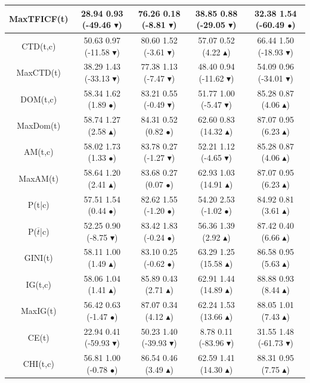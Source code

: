 \documentclass[10pt, red]{beamer}
\newcommand{\triangOK}{\textcolor[rgb]{00,0.45,0.10}{$\blacktriangle$}}
\newcommand{\triangBAD}{\textcolor[rgb]{0.7,00,00}{$\blacktriangledown$}}
\newcommand{\ball}{\textcolor[rgb]{0.7,0.70,0.0}{$\bullet$}}
\begin{document}
{\begin{table}[h]
\begin{adjustwidth}{-0.95cm}{-0.95cm}
\begin{tabular}{|c||c|c|c|c|}
\hline 
MaxTFICF(t)& 28.94 \textpm{} 0.93 (-49.46 \triangBAD)& 76.26 \textpm{} 0.18 (-8.81 \triangBAD)& 38.85 \textpm{} 0.88 (-29.05 \triangBAD)& 32.38 \textpm{} 1.54 (-60.49 \ball)\tabularnewline
\hline 
CTD(t,c)& 50.63 \textpm{} 0.97 (-11.58 \triangBAD)& 80.60 \textpm{} 1.52 (-3.61 \triangBAD)& 57.07 \textpm{} 0.52 (4.22 \triangOK)& 66.44 \textpm{} 1.50 (-18.93 \triangBAD)\tabularnewline
\hline 
MaxCTD(t)& 38.29 \textpm{} 1.43 (-33.13 \triangBAD)& 77.38 \textpm{} 1.13 (-7.47 \triangBAD)& 48.40 \textpm{} 0.94 (-11.62 \triangBAD)& 54.09 \textpm{} 0.96 (-34.01 \triangBAD)\tabularnewline
\hline 
DOM(t,c)& 58.34 \textpm{} 1.62 (1.89 \ball)&  83.21 \textpm{} 0.55 (-0.49 \triangBAD)& 51.77 \textpm{} 1.00 (-5.47 \triangBAD)& 85.28 \textpm{} 0.87 (4.06 \triangOK)\tabularnewline
\hline 
MaxDom(t)& 58.74 \textpm{} 1.27 (2.58 \triangOK)& 84.31 \textpm{} 0.52 (0.82 \ball)& 62.60 \textpm{} 0.83 (14.32 \triangOK)& 87.07 \textpm{} 0.95 (6.23 \triangOK)\tabularnewline
\hline 
\rowcolor{LightCyan2}
AM(t,c)& 58.02 \textpm{} 1.73 (1.33 \ball)& 83.78 \textpm{} 0.27 (-1.27 \triangBAD) & 52.21 \textpm{} 1.12 (-4.65 \triangBAD)& 85.28 \textpm{} 0.87 (4.06 \triangOK)\tabularnewline
\hline 
MaxAM(t)& 58.64 \textpm{} 1.20 (2.41 \triangOK)& 83.68 \textpm{} 0.27 (0.07 \ball)& 62.93 \textpm{} 1.03 (14.91 \triangOK)& 87.07 \textpm{} 0.95 (6.23 \triangOK)\tabularnewline
\hline 
P(t|c)& 57.51 \textpm{} 1.54 (0.44 \ball)& 82.62 \textpm{} 1.55 (-1.20 \ball)& 54.20 \textpm{} 2.53 (-1.02 \ball)& 84.92 \textpm{} 0.81 (3.61 \triangOK)\tabularnewline
\hline 
P($\overline{t}$|c)& 52.25 \textpm{} 0.90 (-8.75 \triangBAD)& 83.42 \textpm{} 1.83 (-0.24 \ball)& 56.36 \textpm{} 1.39 (2.92 \triangOK)& 87.42 \textpm{} 0.40 (6.66 \triangOK)\tabularnewline
\hline 
GINI(t)& 58.11 \textpm{} 1.00 (1.49 \triangOK)& 83.10 \textpm{} 0.25 (-0.62 \ball)& 63.29 \textpm{} 1.25 (15.58 \triangOK)& 86.58 \textpm{} 0.95 (5.63 \triangOK)\tabularnewline
\hline 
IG(t,c)& 58.06 \textpm{} 1.04 (1.41 \triangOK)& 85.89 \textpm{} 0.43 (2.71 \triangOK)& 62.91 \textpm{} 1.44 (14.89 \triangOK)& 88.88 \textpm{} 0.93 (8.44 \triangOK)\tabularnewline
\hline 
MaxIG(t)& 56.42 \textpm{} 0.63 (-1.47 \ball)& 87.07 \textpm{} 0.34 (4.12 \triangOK)& 62.24 \textpm{} 1.53 (13.66 \triangOK)& 88.05 \textpm{} 1.01 (7.43 \triangOK)\tabularnewline
\hline 
CE(t)& 22.94 \textpm{} 0.41 (-59.93 \triangBAD)&  50.23 \textpm{} 1.40 (-39.93 \triangBAD)& 8.78 \textpm{} 0.11 (-83.96 \triangBAD)& 31.55 \textpm{} 1.48 (-61.73 \triangBAD)\tabularnewline
\hline 
CHI(t,c)& 56.81 \textpm{} 1.00 (-0.78 \ball)& 86.54 \textpm{} 0.46 (3.49 \triangOK)& 62.59 \textpm{} 1.41 (14.30 \triangOK)& 88.31 \textpm{} 0.95 (7.75 \triangOK)\tabularnewline

\end{tabular}
\end{adjustwidth}
\end{table}}
\end{document}
